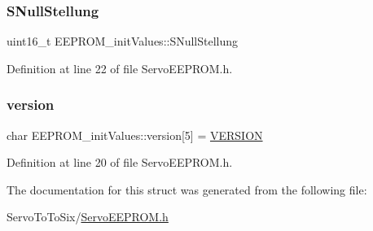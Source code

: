 \subsubsection{\texorpdfstring{S\+Null\+Stellung}{SNullStellung}}
{\footnotesize\ttfamily uint16\+\_\+t E\+E\+P\+R\+O\+M\+\_\+init\+Values\+::\+S\+Null\+Stellung}



Definition at line 22 of file Servo\+E\+E\+P\+R\+O\+M.\+h.

\mbox{\label{struct_e_e_p_r_o_m__init_values_a1f5a8dd62c0be3b35b9d701a0f079be1}} 
\subsubsection{\texorpdfstring{version}{version}}
{\footnotesize\ttfamily char E\+E\+P\+R\+O\+M\+\_\+init\+Values\+::version\mbox{[}5\mbox{]} = \hyperlink{_general_8h_a1c6d5de492ac61ad29aec7aa9a436bbf}{V\+E\+R\+S\+I\+ON}}



Definition at line 20 of file Servo\+E\+E\+P\+R\+O\+M.\+h.



The documentation for this struct was generated from the following file\+:\begin{DoxyCompactItemize}
\item 
Servo\+To\+To\+Six/\hyperlink{_servo_e_e_p_r_o_m_8h}{Servo\+E\+E\+P\+R\+O\+M.\+h}\end{DoxyCompactItemize}
